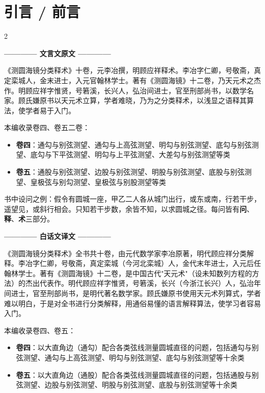 \documentclass[10pt,a4paper]{article}
\newcommand{\leftheader}{%
  \begin{center}\textcolor{classicalcolor}{\small\textbf{———— 文言文原文 ————}}\end{center}
  \vspace{0.2cm}
}
\newcommand{\rightheader}{%
  \begin{center}\textcolor{moderncolor}{\small\textbf{———— 白话文译文 ————}}\end{center}
  \vspace{0.2cm}
}
\begin{document}
\tableofcontents
\newpage

\section*{引言 / 前言}

\begin{paracol}{2}

\leftheader

《测圆海镜分类释术》十卷，元李冶撰，明顾应祥释术。李冶字仁卿，号敬斋，真定栾城人，金末进士，入元官翰林学士。著有《测圆海镜》十二卷，乃天元术之杰作。明顾应祥字惟贤，号箬溪，长兴人，弘治间进士，官至刑部尚书，以数学名家。顾氏嫌原书以天元术立算，学者难晓，乃为之分类释术，以浅显之语释其算法，使学者易于入门。

本编收录卷四、卷五二卷：
\begin{itemize}[leftmargin=1em,itemsep=0pt]
  \item \textbf{卷四}：通勾与别弦测望、通勾与上高弦测望、明勾与别弦测望、底勾与别弦测望、底勾与下平弦测望、明勾与上平弦测望、大差勾与别弦测望等类
  \item \textbf{卷五}：通股与别弦测望、边股与别弦测望、明股与别弦测望、底股与别弦测望、皇极弦与别勾测望、皇极弦与别股测望等类
\end{itemize}

书中设问之例：假令有圆城一座，甲乙二人各从城门出行，或东或南，行若干步，遥望见，或斜行相会。只知若干步数，余皆不知，以求圆城之径。每问皆有\textbf{问}、\textbf{释}、\textbf{术}三部分。

\switchcolumn

\rightheader

《测圆海镜分类释术》全书共十卷，由元代数学家李冶原著，明代顾应祥分类解释。李冶字仁卿，号敬斋，真定栾城（今河北栾城）人，金代末年进士，入元后任翰林学士。著有《测圆海镜》十二卷，是中国古代"天元术"（设未知数列方程的方法）的杰出代表作。明代顾应祥字惟贤，号箬溪，长兴（今浙江长兴）人，弘治年间进士，官至刑部尚书，是明代著名数学家。顾氏嫌原书使用天元术列算式，学者难以明白，于是对全书进行分类解释，用通俗易懂的语言解释算法，使学习者容易入门。

本编收录卷四、卷五：
\begin{itemize}[leftmargin=1em,itemsep=0pt]
  \item \textbf{卷四}：以大直角边（通勾）配合各类弦线测量圆城直径的问题，包括通勾与别弦测望、通勾与上高弦测望、明勾与别弦测望、底勾与别弦测望等十余类
  \item \textbf{卷五}：以大直角边（通股）配合各类弦线测量圆城直径的问题，包括通股与别弦测望、边股与别弦测望、明股与别弦测望、底股与别弦测望等十余类
\end{itemize}


\end{paracol}
\end{document}
